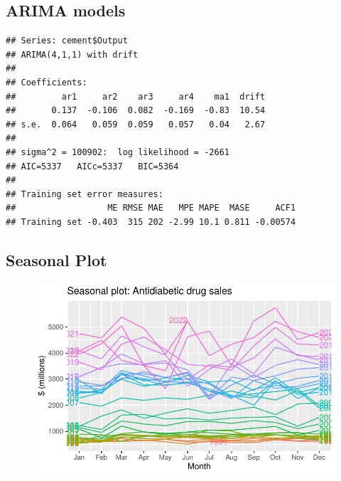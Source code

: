 \documentclass[
  letterpaper,
  DIV=11,
  numbers=noendperiod]{scrartcl}
\newenvironment{Shaded}{\begin{snugshade}}{\end{snugshade}}
\newcommand{\AttributeTok}[1]{\textcolor[rgb]{0.40,0.45,0.13}{#1}}
\newcommand{\FunctionTok}[1]{\textcolor[rgb]{0.28,0.35,0.67}{#1}}
\newcommand{\NormalTok}[1]{\textcolor[rgb]{0.00,0.23,0.31}{#1}}
\newcommand{\OtherTok}[1]{\textcolor[rgb]{0.00,0.23,0.31}{#1}}
\newcommand{\SpecialCharTok}[1]{\textcolor[rgb]{0.37,0.37,0.37}{#1}}
\newcommand{\StringTok}[1]{\textcolor[rgb]{0.13,0.47,0.30}{#1}}
\begin{document}
\hypertarget{arima-models}{%
\subsection{ARIMA models}\label{arima-models}}

\begin{verbatim}
## Series: cement$Output 
## ARIMA(4,1,1) with drift 
## 
## Coefficients:
##         ar1     ar2    ar3     ar4    ma1  drift
##       0.137  -0.106  0.082  -0.169  -0.83  10.54
## s.e.  0.064   0.059  0.059   0.057   0.04   2.67
## 
## sigma^2 = 100902:  log likelihood = -2661
## AIC=5337   AICc=5337   BIC=5364
## 
## Training set error measures:
##                  ME RMSE MAE   MPE MAPE  MASE     ACF1
## Training set -0.403  315 202 -2.99 10.1 0.811 -0.00574
\end{verbatim}

\hypertarget{seasonal-plot}{%
\subsection{Seasonal Plot}\label{seasonal-plot}}

\begin{Shaded}
\end{Shaded}

\begin{figure}[H]

{\centering \includegraphics[width=17.1875in,height=\textheight]{cement_files/figure-pdf/unnamed-chunk-13-1.pdf}

}

\end{figure}
\end{document}
